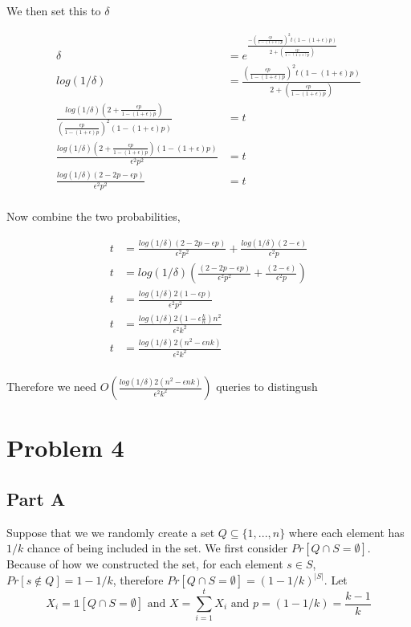 \documentclass[a4paper]{article}
\newcommand{\ind}[1]{\mathds{1}[#1]}
\def \eps{\epsilon}
\begin{document}
We then set this to $\delta$

\begin{align*}
	\delta &= e^{ \frac{-	(\frac{\eps p}{1-(1+\eps)p})^2t(1-(1+\eps)p)}{2 + (\frac{\eps p}{1-(1+\eps)p})}}\\
	log(1/\delta) &=  \frac{	(\frac{\eps p}{1-(1+\eps)p})^2t(1-(1+\eps)p)}{2 + (\frac{\eps p}{1-(1+\eps)p})}\\
	\frac{log(1/\delta) (2 + \frac{\eps p}{1-(1+\eps)p})}{	(\frac{\eps p}{1-(1+\eps)p})^2(1-(1+\eps)p)} &= t  \\
	\frac{log(1/\delta) (2 + \frac{\eps p}{1-(1+\eps)p})(1-(1+\eps)p)}{	\eps^2 p^2} &= t\\
	\frac{log(1/\delta) (2 - 2p - \eps p)}{	\eps^2 p^2} &= t\\
\end{align*}



Now combine the two probabilities, 

\begin{align*}
	t &= \frac{log(1/\delta) (2 - 2p - \eps p)}{	\eps^2 p^2} + \frac{log(1/\delta)(2-\eps)}{\eps^2p}\\
	 t &= log(1/\delta) (\frac{ (2 - 2p - \eps p)}{	\eps^2 p^2} + \frac{(2-\eps)}{\eps^2p})\\
	 t &=  \frac{ log(1/\delta)2(1 - \eps p ) }{	\eps^2 p^2}\\
	 t &=  \frac{ log(1/\delta)2(1 - \eps \frac{k}{n} )n^2 }{	\eps^2 k^2}\\
	 t &=  \frac{ log(1/\delta)2(n^2 - \eps nk ) }{	\eps^2 k^2}\\
\end{align*}

Therefore we need $ O(\frac{ log(1/\delta)2(n^2 - \eps nk ) }{	\eps^2 k^2})$ queries to distingush

\section{Problem 4}
\subsection{Part A}
Suppose that we we randomly create a set $Q \subseteq \{1,...,n\}$ where each element has $1/k$ chance of 
being included in the set. We first consider 
$Pr[Q \cap S = \emptyset]$. Because of how we constructed the set, for each element $s \in S$, 
$Pr[s \notin Q] = 1 - 1/k$, therefore $Pr[Q \cap S = \emptyset] = (1 - 1/k)^{ |S| }$. 
Let $$X_i = \ind{Q \cap S = \emptyset} \text{  and  } X = \sum_{i=1}^{t} X_i  \text{  and  } p = (1-1/k) = \frac{k-1}{k}$$
\end{document}
